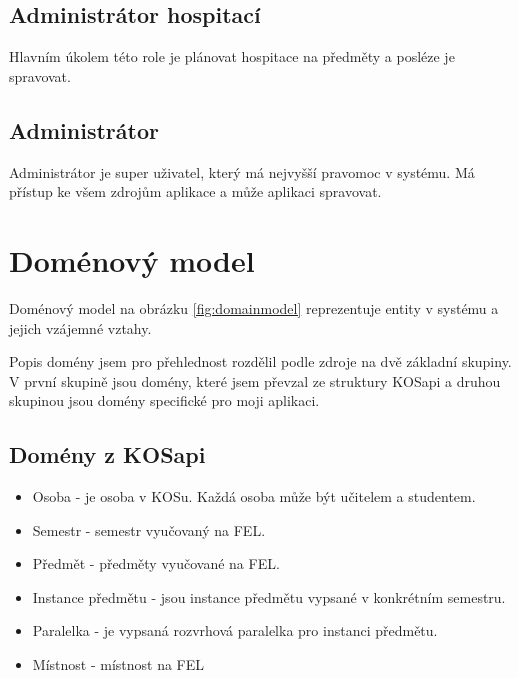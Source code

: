 \subsection{Administrátor hospitací}
Hlavním úkolem této role je plánovat hospitace na předměty a posléze je spravovat.

\subsection{Administrátor}
Administrátor je super uživatel, který má nejvyšší pravomoc v systému. Má přístup ke všem zdrojům aplikace a může aplikaci spravovat.

\newpage 
\section{Doménový model}
Doménový model na obrázku \ref{fig:domainmodel} reprezentuje entity v systému a jejich vzájemné vztahy. 

Popis domény jsem pro přehlednost rozdělil podle zdroje na dvě základní skupiny. V první skupině jsou domény, které jsem převzal ze struktury KOSapi a druhou skupinou jsou domény specifické pro moji aplikaci. 

\label{sec:domeny_kosapi} 
\subsection{Domény z KOSapi}
\begin{itemize}
\item Osoba - je osoba v KOSu. Každá osoba může být učitelem a studentem.
\item Semestr - semestr vyučovaný na FEL. 
\item Předmět - předměty vyučované na FEL.
\item Instance předmětu - jsou instance předmětu vypsané v konkrétním semestru.
\item Paralelka - je vypsaná rozvrhová paralelka pro instanci předmětu.
\item Místnost - místnost na FEL
\end{itemize}

